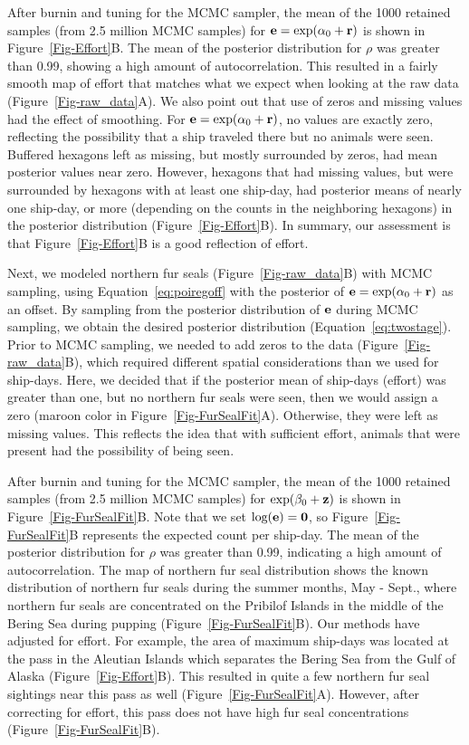 \documentclass[11pt, titlepage]{article}
\begin{document}
\begin{spacing}{1.9}
\begin{flushleft}
After burnin and tuning for the MCMC sampler, the mean of the 1000 retained samples (from 2.5 million MCMC samples) for $\mathbf{e} = \exp(\alpha_{0} + \mathbf{r})$ is shown in Figure~\ref{Fig-Effort}B.  The mean of the posterior distribution for $\rho$ was greater than 0.99, showing a high amount of autocorrelation.  This resulted in a fairly smooth map of effort that matches what we expect when looking at the raw data (Figure~\ref{Fig-raw_data}A).  We also point out that use of zeros and missing values had the effect of smoothing. For $\mathbf{e} = \exp(\alpha_{0} + \mathbf{r})$, no values are exactly zero, reflecting the possibility that a ship traveled there but no animals were seen.  Buffered hexagons left as missing, but mostly surrounded by zeros, had mean posterior values near zero. However, hexagons that had missing values, but were surrounded by hexagons with at least one ship-day, had posterior means of nearly one ship-day, or more (depending on the counts in the neighboring hexagons) in the posterior distribution (Figure~\ref{Fig-Effort}B).  In summary, our assessment is that Figure~\ref{Fig-Effort}B is a good reflection of effort.

Next, we modeled northern fur seals (Figure~\ref{Fig-raw_data}B) with MCMC sampling, using Equation~\eqref{eq:poiregoff} with the posterior of $\mathbf{e} = \exp(\alpha_{0} + \mathbf{r})$ as an offset. By sampling from the posterior distribution of $\mathbf{e}$ during MCMC sampling, we obtain the desired posterior distribution (Equation~\ref{eq:twostage}). Prior to MCMC sampling, we needed to add zeros to the data (Figure~\ref{Fig-raw_data}B), which required different spatial considerations than we used for ship-days. Here, we decided that if the posterior mean of ship-days (effort) was greater than one, but no northern fur seals were seen, then we would assign a zero (maroon color in Figure~\ref{Fig-FurSealFit}A). Otherwise, they were left as missing values.  This reflects the idea that with sufficient effort, animals that were present had the possibility of being seen.  
 
After burnin and tuning for the MCMC sampler, the mean of the 1000 retained samples (from 2.5 million MCMC samples) for $\exp(\beta_{0} + \mathbf{z})$ is shown in Figure~\ref{Fig-FurSealFit}B.  Note that we set $\textrm{log}(\mathbf{e}) = \mathbf{0}$, so Figure~\ref{Fig-FurSealFit}B represents the expected count per ship-day. The mean of the posterior distribution for $\rho$ was greater than 0.99, indicating a high amount of autocorrelation.  The map of northern fur seal distribution shows the known distribution of northern fur seals during the summer months, May - Sept., where northern fur seals are concentrated on the Pribilof Islands in the middle of the Bering Sea during pupping (Figure~\ref{Fig-FurSealFit}B).  Our methods have adjusted for effort. For example, the area of maximum ship-days was located at the pass in the Aleutian Islands which separates the Bering Sea from the Gulf of Alaska (Figure~\ref{Fig-Effort}B).  This resulted in quite a few northern fur seal sightings near this pass as well (Figure~\ref{Fig-FurSealFit}A).  However, after correcting for effort, this pass does not have high fur seal concentrations (Figure~\ref{Fig-FurSealFit}B).


\end{flushleft}
\end{spacing}
\end{document}
